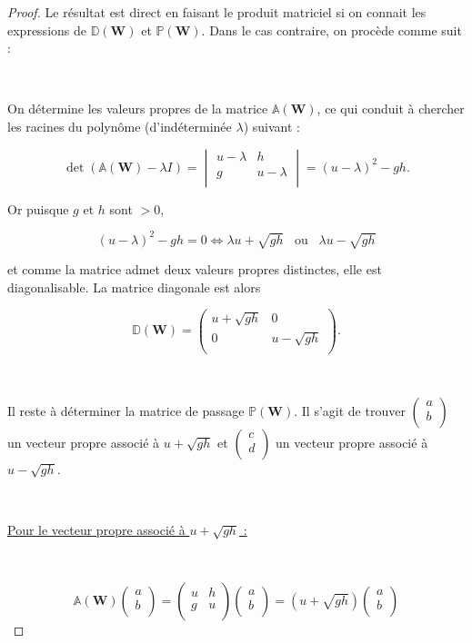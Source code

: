 \documentclass[
11pt, %
francais, %
singlespacing, %
headsepline, %
]{MastersDoctoralThesis} %
\begin{document}
\begin{proof} Le résultat est direct en faisant le produit matriciel si on connait les expressions de $\mathbb{D}(\textbf{W})$ et $\mathbb{P}(\textbf{W})$. Dans le cas contraire, on procède comme suit :

\

On détermine les valeurs propres de la matrice $\mathbb{A}(\textbf{W})$, ce qui conduit à chercher les racines du polynôme (d'indéterminée $\lambda$) suivant :

$$\det(\mathbb{A}(\textbf{W})-\lambda I) =\begin{vmatrix}
   u-\lambda & h  \\
   g & u-\lambda  \\
\end{vmatrix} = (u-\lambda)^{2}-gh.$$

Or puisque $g$ et $h$ sont $>0$,

$$(u-\lambda)^{2}-gh=0 \Leftrightarrow \lambda u +\sqrt{gh} \phantom{...}\text{ou}\phantom{...} \lambda u -\sqrt{gh}$$

et comme la matrice admet deux valeurs propres distinctes, elle est diagonalisable. La matrice diagonale est alors

$$\mathbb{D}(\textbf{W}) =\begin{pmatrix}
   u+\sqrt{gh} & 0  \\
   0 & u-\sqrt{gh}  \\
\end{pmatrix}.
$$

\

Il reste à déterminer la matrice de passage $\mathbb{P}(\textbf{W})$. Il s'agit de trouver 
$\begin{pmatrix}
   a\\
   b\\
\end{pmatrix}
$ un vecteur propre associé à $u +\sqrt{gh}$ et
$\begin{pmatrix}
   c\\
   d\\
\end{pmatrix}
$ un vecteur propre associé à $u -\sqrt{gh}$.

\

\underline{Pour le vecteur propre associé à $u +\sqrt{gh}$ :}

\

$$\mathbb{A}(\textbf{W}) \begin{pmatrix}
   a\\
   b\\
\end{pmatrix}=\begin{pmatrix}
   u & h  \\
   g & u  \\
\end{pmatrix} \begin{pmatrix}
   a\\
   b\\
\end{pmatrix}=(u+\sqrt{gh})\begin{pmatrix}
   a\\
   b\\
\end{pmatrix}$$


\end{proof}
\end{document}
